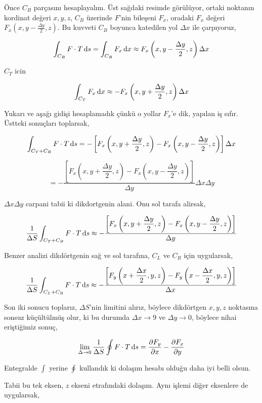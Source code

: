 \documentclass[12pt,fleqn]{article}\usepackage{../../common}
\begin{document}
Önce $C_B$ parçasını hesaplayalım. Üst sağdaki resimde görülüyor, ortaki
noktanın kordinat değeri $x,y,z$, $C_B$ üzerinde $F$'nin bileşeni $F_x$, oradaki
$F_x$ değeri $F_x(x,y-\frac{\Delta y}{2}, z)$. Bu kuvveti $C_B$ boyunca
katedilen yol $\Delta x$ ile çarpıyoruz,

$$
\int_{C_B} F \cdot T \,\mathrm{d} s =
\int_{C_B} F_x \,\mathrm{d} x \approx
F_x \left( x,y-\frac{\Delta y}{2}, z \right) \Delta x
$$

$C_T$ icin

$$
\int_{C_T} F_x \,\mathrm{d} x \approx -F_x \left(x,y+\frac{\Delta y}{2}, z \right) \Delta x
$$

Yukarı ve aşağı gidişi hesaplamadık çünkü o yollar $F_x$'e dik, yapılan iş
sıfır. Üstteki sonuçları toplarsak,

$$
\int_{C_T+C_B} F \cdot T \,\mathrm{d} s  = - \left[
F_x \left( x,y+\frac{\Delta y}{2},z \right) -
F_x \left( x,y-\frac{\Delta y}{2},z \right)
\right] \Delta x
$$

$$
= - \dfrac{
\left[
  F_x \left( x,y+\dfrac{\Delta y}{2},z \right) -
  F_x \left( x,y-\dfrac{\Delta y}{2},z \right)
\right]  
}{\Delta y}
\Delta x \Delta y
$$

$\Delta x \Delta y$ carpani tabii ki dikdortgenin alani. Onu sol tarafa alirsak,

$$
\frac{1}{\Delta S}\int_{C_T+C_B} F \cdot T \,\mathrm{d} s \approx
- \dfrac{
\left[
  F_x \left( x,y+\dfrac{\Delta y}{2},z \right) -
  F_x \left( x,y-\dfrac{\Delta y}{2},z \right)
\right]  
}{\Delta y}
$$

Benzer analizi dikdörtgenin sağ ve sol tarafına, $C_L$ ve $C_R$ için uygularsak,

$$
\frac{1}{\Delta S}\int_{C_L+C_R} F \cdot T \,\mathrm{d} s \approx
- \dfrac{
\left[
  F_y \left( x+\dfrac{\Delta x}{2},y,z \right) -
  F_y \left( x-\dfrac{\Delta x}{2},y,z \right)
\right]  
}{\Delta x}
$$

Son iki sonucu toplarız, $\Delta S$'nin limitini alırız, böylece dikdörtgen
$x,y,z$ noktasına sonsuz küçültülmüş olur, ki bu durumda $\Delta x \to 9$ ve
$\Delta y \to 0$, böylece nihai eriştiğimiz sonuç,

$$
\lim_{\Delta \to 0} \frac{1}{\Delta S} \oint F \cdot T \,\mathrm{d} s =
\frac{\partial F_y}{\partial x} - \frac{\partial F_x}{\partial y}
$$

Entegralde $\int$ yerine $\oint$ kullandık ki dolaşım hesabı olduğu daha iyi
belli olsun.

Tabii bu tek eksen, $z$ ekseni etrafındaki dolaşım. Aynı işlemi diğer eksenlere
de uygularsak,
\end{document}
